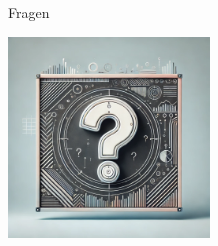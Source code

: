 \documentclass[
    ngerman,%
    authorontitle=true,
]{bfhbeamer}
\begin{document}
    \begin{frame}{Fragen}
        \begin{center}
            \includegraphics[width=0.4\textwidth]{assets/presentation/questions_frame_image}
        \end{center}
    \end{frame}
\end{document}
